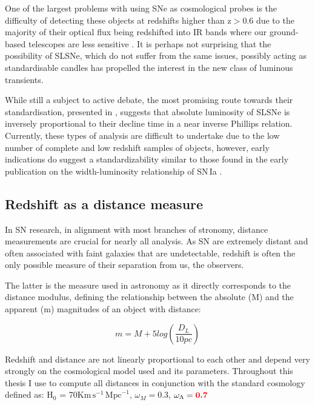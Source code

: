 One of the largest problems with using SNe as cosmological probes is the difficulty of detecting these objects at redshifts higher than z$>$0.6 due to the majority of their optical flux being redshifted into IR bands where our ground-based telescopes are less sensitive \citep{Smith2018}. It is perhaps not surprising that the possibility of SLSNe, which do not suffer from the same issues, possibly acting as standardisable candles \citep{Inserra2014,Papadopoulos2015,Inserra2018a} has propelled the interest in the new class of luminous transients.

While still a subject to active debate, the most promising route towards their standardisation, presented in \citet{Inserra2018a}, suggests that absolute luminosity of SLSNe is inversely proportional to their decline time in a near inverse Phillips relation. Currently, these types of analysis are difficult to undertake due to the low number of complete and low redshift samples of objects, however, early indications do suggest a standardizability similar to those found in the early publication on the width-luminosity relationship of SN\,Ia \citep{Inserra2018a}.

\subsection{Redshift as a distance measure}
In SN research, in alignment with most branches of stronomy, distance measurements are crucial for nearly all analysis. As SN are extremely distant and often associated with faint galaxies that are undetectable, redshift is often the only possible measure of their separation from us, the observers.

 The latter is the measure used in astronomy as it directly corresponds to the distance modulus, defining the relationship between the absolute (M) and the apparent (m) magnitudes of an object with distance:

\begin{equation}
  m = M + 5log(\frac{D_L}{10pc})
\end{equation}

Redshift and distance are not linearly proportional to each other and depend very strongly on the cosmological model used and its parameters. Throughout this thesis I use  to compute all distances in conjunction with the standard cosmology defined as: H$_0$ = 70$\mathrm{Km}\,\mathrm{s}^{-1}\,\mathrm{Mpc}^{-1}$, $\omega_M = 0.3$, $\omega_{\Lambda} = \textcolor{red}{\textbf{0.7}}$

